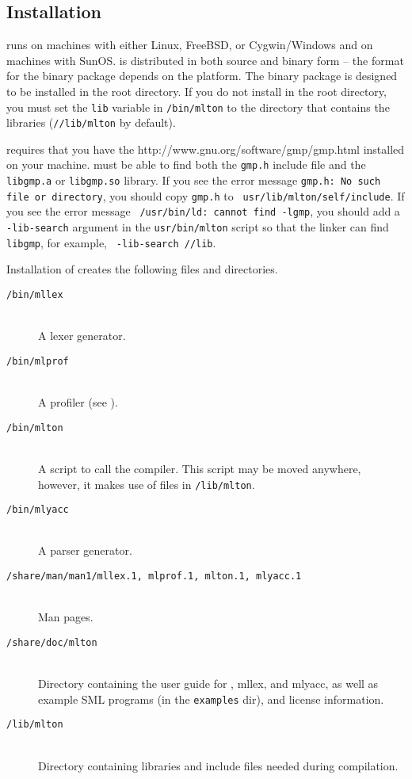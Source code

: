 
\subsection{Installation}

{\mlton} runs on {\intel} machines with either Linux, FreeBSD, or
Cygwin/Windows and on {\sparc} machines with SunOS.  {\mlton} is
distributed in both source and binary form -- the format for the
binary package depends on the platform.  The binary package is
designed to be installed in the root directory.  If you do not install
{\mlton} in the root directory, you must set the {\tt lib} variable in
{\tt \prefix/bin/mlton} to the directory that contains the libraries
({\tt /\prefix/lib/mlton} by default).

{\mlton} requires that you have the
		  {http://www.gnu.org/software/gmp/gmp.html}
installed on your machine.  {\mlton} must be able to find both the
{\tt gmp.h} include file and the {\tt libgmp.a} or {\tt libgmp.so}
library. If you see the error message {\tt gmp.h: No such file or
directory}, you should copy {\tt gmp.h} to {\tt
usr/lib/mlton/self/include}.  If you see the error message {\tt
/usr/bin/ld: cannot find -lgmp}, you 
should add a {\tt -lib-search} argument in the {\tt usr/bin/mlton}
script so that the linker can find {\tt libgmp}, for example, {\tt
-lib-search /\prefix/lib}.

Installation of {\mlton} creates the following files and directories.

\newcommand{\place}[1]{\item[\tt #1]\hspace{1in}\\}

\begin{description}

\place{\prefix/bin/mllex}
A lexer generator.

\place{\prefix/bin/mlprof}
A profiler (see ).

\place{\prefix/bin/mlton}
A script to call the compiler.
This script may be moved anywhere, however,
it makes use of files in {\tt \prefix/lib/mlton}.

\place{\prefix/bin/mlyacc}
A parser generator.

\place{\prefix/share/man/man1/mllex.1, mlprof.1, mlton.1, mlyacc.1}
Man pages.

\place{\prefix/share/doc/mlton}
Directory containing the user guide for {\mlton}, mllex, and mlyacc,
as well as example SML programs (in the {\tt examples} dir), and
license information.

\place{\prefix/lib/mlton}
Directory containing libraries and include files needed during
compilation.

\end{description}

